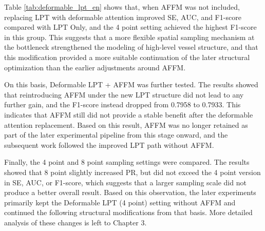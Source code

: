 \documentclass[a4paper,12pt]{article}
\begin{document}
\begin{table}[htbp]
\centering
\caption{Comparison of experiments related to deformable LPT}
\label{tab:deformable_lpt_en}
\end{table}

Table \ref{tab:deformable_lpt_en} shows that, when AFFM was not included, replacing LPT with deformable attention improved SE, AUC, and F1-score compared with LPT Only, and the 4 point setting achieved the highest F1-score in this group. This suggests that a more flexible spatial sampling mechanism at the bottleneck strengthened the modeling of high-level vessel structure, and that this modification provided a more suitable continuation of the later structural optimization than the earlier adjustments around AFFM.

On this basis, Deformable LPT + AFFM was further tested. The results showed that reintroducing AFFM under the new LPT structure did not lead to any further gain, and the F1-score instead dropped from 0.7958 to 0.7933. This indicates that AFFM still did not provide a stable benefit after the deformable attention replacement. Based on this result, AFFM was no longer retained as part of the later experimental pipeline from this stage onward, and the subsequent work followed the improved LPT path without AFFM.

Finally, the 4 point and 8 point sampling settings were compared. The results showed that 8 point slightly increased PR, but did not exceed the 4 point version in SE, AUC, or F1-score, which suggests that a larger sampling scale did not produce a better overall result. Based on this observation, the later experiments primarily kept the Deformable LPT (4 point) setting without AFFM and continued the following structural modifications from that basis. More detailed analysis of these changes is left to Chapter 3.
\end{document}
